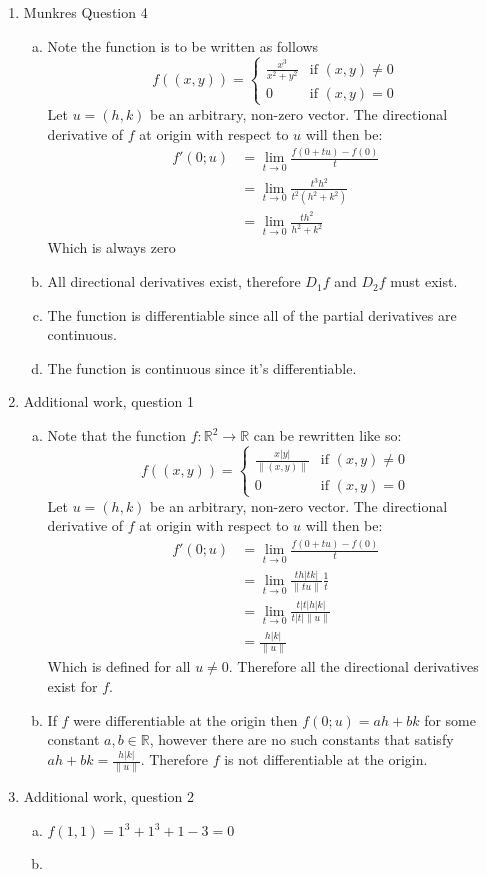 \documentclass[letterpaper,10pt]{article}
\begin{document}
\begin{enumerate}
	\item Munkres Question 4
	\begin{enumerate}[a)]
		\item Note the function is to be written as follows
		\[
		 f((x,y)) =
		  \begin{cases}
		   \frac{x^3}{x^2 + y^2} & \text{if } (x, y) \neq 0 \\
		   0       & \text{if } (x, y) = 0
		  \end{cases}
		\]
		Let $u = (h, k)$ be an arbitrary, non-zero vector. The directional derivative of $f$ at origin with respect to $u$ will then be:
		\begin{align*}
			f'(0; u) & =  \lim_{t \to 0} \frac{f(0 + tu) - f(0)}{t} \\
			& =  \lim_{t \to 0} \frac{t^3 h^2}{t^2(h^2 + k^2)} \\
			& =  \lim_{t \to 0} \frac{t h^2}{h^2 + k^2}
		\end{align*}
		Which is always zero
		\item All directional derivatives exist, therefore $D_1 f$ and $D_2 f$ must exist.
		\item The function is differentiable since all of the partial derivatives are continuous.
		\item The function is continuous since it's differentiable.
	\end{enumerate}

	\item Additional work, question 1
	\begin{enumerate}[a)]
		\item Note that the function $f:\mathbb{R}^2 \to \mathbb{R}$ can be rewritten like so:
		\[
		 f((x,y)) =
		  \begin{cases}
		   \frac{x|y|}{\|(x,y)\|} & \text{if } (x, y) \neq 0 \\
		   0       & \text{if } (x, y) = 0
		  \end{cases}
		\]
		Let $u = (h, k)$ be an arbitrary, non-zero vector. The directional derivative of $f$ at origin with respect to $u$ will then be:
		\begin{align*}
			f'(0; u) & =  \lim_{t \to 0} \frac{f(0 + tu) - f(0)}{t} \\
			& =  \lim_{t \to 0} \frac{t h |t k|}{\|tu\|}\frac{1}{t} \\
			& =  \lim_{t \to 0} \frac{t |t| h |k|}{t|t|\|u\|} \\
			& =  \frac{h |k|}{\|u\|}
		\end{align*}
		Which is defined for all $u \neq 0$. Therefore all the directional derivatives exist for $f$.
		\item If $f$ were differentiable at the origin then $f(0; u) = ah + bk$ for some constant $a,b \in \mathbb{R}$, however there are no such constants that satisfy $ah + bk = \frac{h |k|}{\|u\|}$. Therefore $f$ is not differentiable at the origin.
	\end{enumerate}

	\item Additional work, question 2
	\begin{enumerate}[a)]
		\item $f(1,1) = 1^3 + 1^3 + 1 -  3 = 0$
		\item 
	\end{enumerate}


\end{enumerate}
\end{document}
